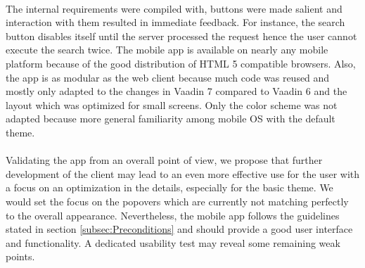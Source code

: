 \\
The internal requirements were compiled with, buttons were made salient and interaction with them resulted in immediate feedback. For instance, the search button disables itself until the server processed the request hence the user cannot execute the search twice. The mobile app is available on nearly any mobile platform because of the good distribution of HTML 5 compatible browsers. Also, the app is as modular as the web client because much code was reused and mostly only adapted to the changes in Vaadin 7 compared to Vaadin 6 and the layout which was optimized for small screens. Only the color scheme was not adapted because more general familiarity among mobile OS with the default theme. 
\\
\\
Validating the app from an overall point of view, we propose that further development of the client may lead to an even more effective use for the user with a focus on an optimization in the details, especially for the basic theme. We would set the focus on the popovers which are currently not matching perfectly to the overall appearance. Nevertheless, the mobile app follows the guidelines stated in section \ref{subsec:Preconditions}  and should provide a good user interface and functionality. A dedicated usability test may reveal some remaining weak points.